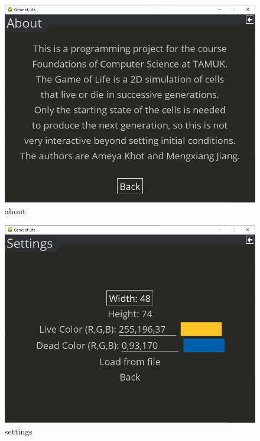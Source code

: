 \documentclass[12pt]{report}
\begin{document}
\begin{figure}[ht]
    \centering
    \includegraphics[width=\textwidth]{about}
    \caption{about}
\end{figure}

\begin{figure}[ht]
    \centering
    \includegraphics[width=\textwidth]{settings}
    \caption{settings}
\end{figure}
\end{document}
